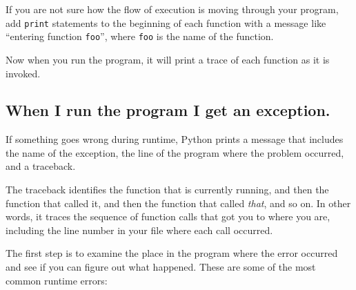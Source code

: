 \documentclass[10pt]{book}
\begin{document}
If you are not sure how the flow of execution is moving through
your program, add {\tt print} statements to the beginning of each
function with a message like ``entering function {\tt foo}'', where
{\tt foo} is the name of the function.

Now when you run the program, it will print a trace of each
function as it is invoked.


\subsection{When I run the program I get an exception.}

If something goes wrong during runtime, Python
prints a message that includes the name of the
exception, the line of the program where the problem occurred,
and a traceback.

The traceback identifies the function that is currently running, and
then the function that called it, and then the function that called
{\em that}, and so on.  In other words, it traces the sequence of
function calls that got you to where you are, including the line
number in your file where each call occurred.

The first step is to examine the place in the program where
the error occurred and see if you can figure out what happened.
These are some of the most common runtime errors:
\end{document}
